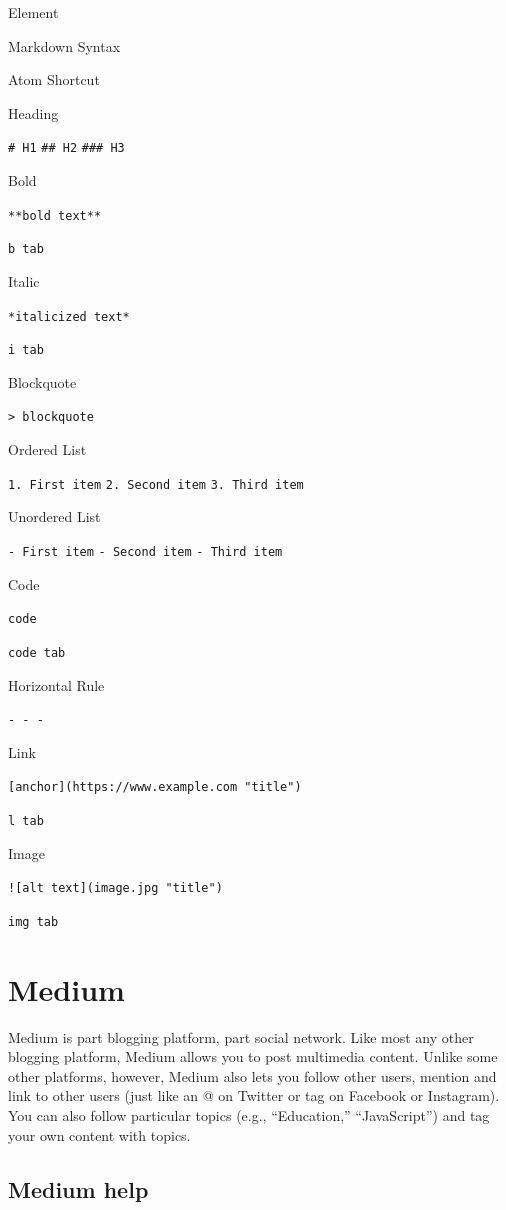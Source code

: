 \documentclass[]{book}
\theoremstyle{definition}
\theoremstyle{definition}
\theoremstyle{definition}
\theoremstyle{remark}
\begin{document}
Element

Markdown Syntax

Atom Shortcut

Heading

\texttt{\#\ H1} \texttt{\#\#\ H2} \texttt{\#\#\#\ H3}

Bold

\texttt{**bold\ text**}

\texttt{b\ tab}

Italic

\texttt{*italicized\ text*}

\texttt{i\ tab}

Blockquote

\texttt{\textgreater{}\ blockquote}

Ordered List

\texttt{1.\ First\ item} \texttt{2.\ Second\ item}
\texttt{3.\ Third\ item}

Unordered List

\texttt{-\ First\ item} \texttt{-\ Second\ item} \texttt{-\ Third\ item}

Code

\texttt{\textasciigrave{}code\textasciigrave{}}

\texttt{code\ tab}

Horizontal Rule

\texttt{-\ -\ -}

Link

\texttt{{[}anchor{]}(https://www.example.com\ "title")}

\texttt{l\ tab}

Image

\texttt{!{[}alt\ text{]}(image.jpg\ "title")}

\texttt{img\ tab}

\hypertarget{medium}{%
\chapter{Medium}\label{medium}}

Medium is part blogging platform, part social network. Like most any
other blogging platform, Medium allows you to post multimedia content.
Unlike some other platforms, however, Medium also lets you follow other
users, mention and link to other users (just like an @ on Twitter or tag
on Facebook or Instagram). You can also follow particular topics (e.g.,
``Education,'' ``JavaScript'') and tag your own content with topics.

\hypertarget{medium-help}{%
\section{Medium help}\label{medium-help}}
\end{document}
